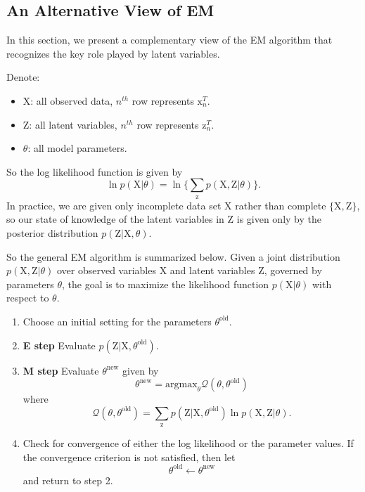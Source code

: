 \documentclass[a4paper]{book}
\newcommand{\mrm}{\mathrm}
\begin{document}
\subsection{An Alternative View of EM}
In this section, we present a complementary view of the EM algorithm that recognizes the key role played by latent variables.

Denote:
\begin{itemize}
  \item $\mrm X$: all observed data, $n^{th}$ row represents $\mrm x_n^T$.
  \item $\mrm Z$: all latent variables, $n^{th}$ row represents $\mrm z_n^T$.
  \item $\theta$: all model parameters.
\end{itemize}
So the log likelihood function is given by
\begin{equation}\label{}
  \ln p(\mrm X|\theta) = \ln\{\sum_{\mrm z}p(\mrm X,\mrm Z|\theta)\}.
\end{equation}
In practice, we are given only incomplete data set $\mrm X$ rather than complete $\{\mrm{X,Z}\}$, so our state of knowledge of the latent variables in $\mrm Z$ is given only by the posterior distribution $p(\mrm Z|\mrm X,\theta)$.

So the general EM algorithm is summarized below. Given a joint distribution $p(\mrm X,\mrm Z|\theta)$ over observed variables $\mrm X$ and latent variables $\mrm Z$, governed by parameters $\theta$, the goal is to maximize the likelihood function $p(\mrm X|\theta)$ with respect to $\theta$.
\begin{enumerate}
  \item Choose an initial setting for the parameters $\theta^{\mrm{old}}$.
  \item \textbf{E step} Evaluate $p(\mrm Z|\mrm X, \theta^{\mrm{old}})$.
  \item \textbf{M step} Evaluate $\theta^{\mrm{new}}$ given by
  \begin{equation}\label{}
    \theta^{\mrm{new}} = \mrm{argmax}_\theta \mathcal Q(\theta,\theta^{\mrm{old}})
  \end{equation}
  where
  \begin{equation}\label{}
    \mathcal Q(\theta,\theta^{\mrm{old}}) = \sum_\mrm{z} p(\mrm Z|\mrm X,\theta^{{\mrm{old}}})\ln p(\mrm X,\mrm Z|\theta).
  \end{equation}
  \item Check for convergence of either the log likelihood or the parameter values. If the convergence criterion is not satisfied, then let
  \begin{equation}\label{}
    \theta^{\mrm{old}} \leftarrow \theta^{\mrm{new}}
  \end{equation}
  and return to step 2.
\end{enumerate}
\end{document}
